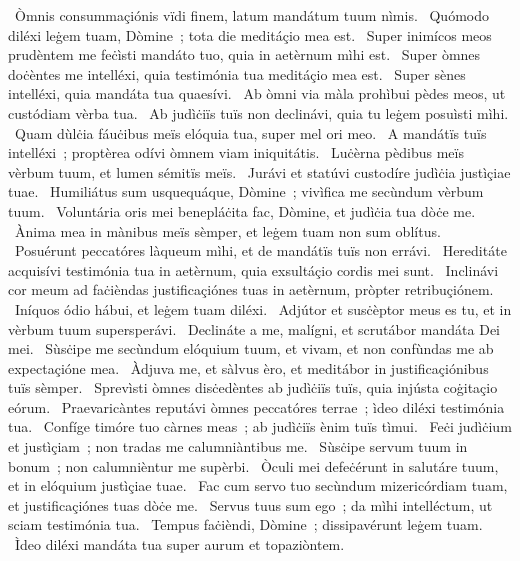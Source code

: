 ~Òmnis consummaçiónis vïdi finem, latum mandátum tuum nìmis. 
~Quómodo diléxi leġem tuam, Dòmine~; tota die meditáçio mea est. 
~Super inimícos meos prudèntem me feċìsti mandáto tuo, quia in aetèrnum mìhi est. 
~Super òmnes doċèntes me intelléxi, quia testimónia tua meditáçio mea est. 
~Super sènes intelléxi, quia mandáta tua quaesívi. 
~Ab òmni via màla prohìbui pèdes meos, ut custódiam vèrba tua. 
~Ab judìċiïs tuïs non declinávi, quia tu leġem posuìsti mìhi. 
~Quam dùlċia fáuċibus meïs elóquia tua, super mel ori meo. 
~A mandátïs tuïs intelléxi~; proptèrea odívi òmnem viam iniquitátis. 
~Luċèrna pèdibus meïs vèrbum tuum, et lumen sémitïs meïs. 
~Jurávi et statúvi custodíre judìċia justìçiae tuae. 
~Humiliátus sum usquequáque, Dòmine~; vivìfica me secùndum vèrbum tuum. 
~Voluntária oris mei benepláċita fac, Dòmine, et judìċia tua dòċe me. 
~Ànima mea in mànibus meïs sèmper, et leġem tuam non sum oblítus. 
~Posuérunt peccatóres làqueum mìhi, et de mandátïs tuïs non errávi. 
~Hereditáte acquisívi testimónia tua in aetèrnum, quia exsultáçio cordis mei sunt. 
~Inclinávi cor meum ad faċièndas justificaçiónes tuas in aetèrnum, pròpter retribuçiónem. 
~Iníquos ódio hábui, et leġem tuam diléxi. 
~Adjútor et susċèptor meus es tu, et in vèrbum tuum supersperávi. 
~Declináte a me, malígni, et scrutábor mandáta Dei mei. 
~Sùsċipe me secùndum elóquium tuum, et vivam, et non confùndas me ab expectaçióne mea. 
~Àdjuva me, et sàlvus èro, et meditábor in justificaçiónibus tuïs sèmper. 
~Sprevìsti òmnes disċedèntes ab judìċiïs tuïs, quia injústa coġitaçio eórum. 
~Praevaricàntes reputávi òmnes peccatóres terrae~; ìdeo diléxi testimónia tua. 
~Confíge timóre tuo càrnes meas~; ab judìċiïs ènim tuïs tìmui. 
~Feċi judìċium et justìçiam~; non tradas me calumniàntibus me. 
~Sùsċipe servum tuum in bonum~; non calumnièntur me supèrbi. 
~Òculi mei defeċérunt in salutáre tuum, et in elóquium justìçiae tuae. 
~Fac cum servo tuo secùndum mizericórdiam tuam, et justificaçiónes tuas dòċe me. 
~Servus tuus sum ego~; da mìhi intelléctum, ut sciam testimónia tua. 
~Tempus faċièndi, Dòmine~; dissipavérunt leġem tuam. 
~Ìdeo diléxi mandáta tua super aurum et topaziòntem. 
